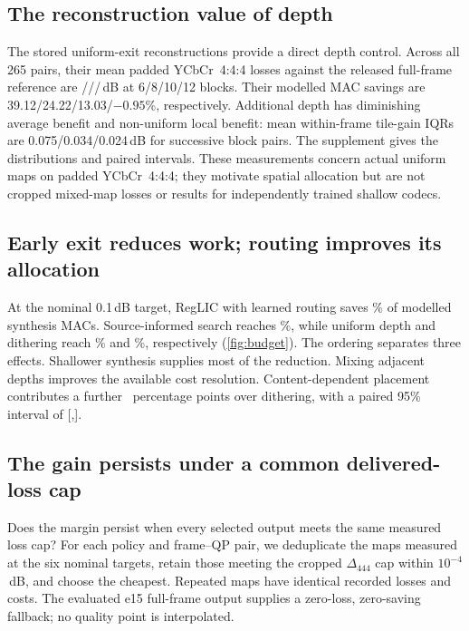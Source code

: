 \subsection{The reconstruction value of depth}

The stored uniform-exit reconstructions provide a direct depth control.
Across all 265 pairs, their mean padded YCbCr~4:4:4 losses against the released
full-frame reference are \UniformLossSix/\UniformLossEight/\UniformLossTen/\UniformLossTwelve\,dB at 6/8/10/12 blocks.
Their modelled MAC savings are 39.12/24.22/13.03/$-0.95$\%, respectively.
Additional depth has diminishing average benefit and non-uniform local
benefit: mean within-frame tile-gain IQRs are 0.075/0.034/0.024\,dB for
successive block pairs. The supplement gives the distributions and paired
intervals. These measurements concern actual uniform maps on padded YCbCr~4:4:4;
they motivate spatial allocation but are not cropped mixed-map losses or
results for independently trained shallow codecs.

\subsection{Early exit reduces work; routing improves its allocation}

At the nominal 0.1\,dB target, RegLIC with learned routing saves
\MainRouterSaving\% of modelled synthesis MACs. Source-informed search reaches
\MainOracleSaving\%, while uniform depth and dithering reach
\MainUniformSaving\% and \MainDitherSaving\%, respectively
(\cref{fig:budget}). The ordering separates three effects. Shallower
synthesis supplies most of the reduction. Mixing adjacent depths improves
the available cost resolution. Content-dependent placement contributes a
further \MainPremium\ percentage points over dithering, with a paired 95\%
interval of [\MainPremiumLow,\MainPremiumHigh].

\subsection{The gain persists under a common delivered-loss cap}

Does the margin persist when every selected output meets the same measured
loss cap? For each policy and frame--QP pair, we deduplicate the maps
measured at the six nominal targets, retain those meeting the cropped
$\Delta_{444}$ cap within $10^{-4}$\,dB, and choose the cheapest. Repeated
maps have identical recorded losses and costs. The evaluated e15 full-frame
output supplies a zero-loss, zero-saving fallback; no quality point is
interpolated.

